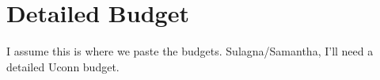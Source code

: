 \section{Detailed Budget}

I assume this is where we paste the budgets.  Sulagna/Samantha, I'll need a detailed Uconn budget.
